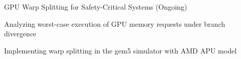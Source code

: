 

\begin{cvprojects}

  \cvproject
    {GPU Warp Splitting for Safety-Critical Systems (Ongoing)} %
    {
      \begin{cvitems} %
        \item {Analyzing worst-case execution of GPU memory requests under branch divergence}
        \item {Implementing warp splitting in the gem5 simulator with AMD APU model}
      \end{cvitems}
    }
    

\end{cvprojects}

